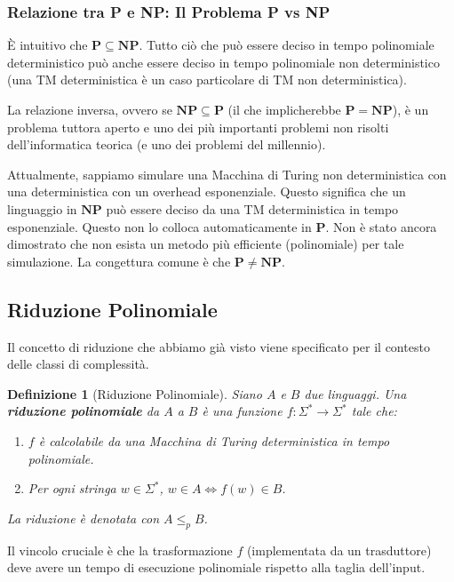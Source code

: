 \documentclass[a4paper]{article}
\newtheorem{definition}{Definizione}
\begin{document}
\subsubsection{Relazione tra P e NP: Il Problema P vs NP}

È intuitivo che $\mathbf{P} \subseteq \mathbf{NP}$. Tutto ciò che può essere deciso in tempo polinomiale deterministico può anche essere deciso in tempo polinomiale non deterministico (una TM deterministica è un caso particolare di TM non deterministica).

La relazione inversa, ovvero se $\mathbf{NP} \subseteq \mathbf{P}$ (il che implicherebbe $\mathbf{P} = \mathbf{NP}$), è un problema tuttora aperto e uno dei più importanti problemi non risolti dell'informatica teorica (e uno dei problemi del millennio).

Attualmente, sappiamo simulare una Macchina di Turing non deterministica con una deterministica con un overhead esponenziale. Questo significa che un linguaggio in $\mathbf{NP}$ può essere deciso da una TM deterministica in tempo esponenziale. Questo non lo colloca automaticamente in $\mathbf{P}$. Non è stato ancora dimostrato che non esista un metodo più efficiente (polinomiale) per tale simulazione. La congettura comune è che $\mathbf{P} \ne \mathbf{NP}$.

\subsection{Riduzione Polinomiale}

Il concetto di riduzione che abbiamo già visto viene specificato per il contesto delle classi di complessità.

\begin{definition}[Riduzione Polinomiale]
Siano $A$ e $B$ due linguaggi. Una \textbf{riduzione polinomiale} da $A$ a $B$ è una funzione $f: \Sigma^* \to \Sigma^*$ tale che:
\begin{enumerate}
    \item $f$ è calcolabile da una Macchina di Turing deterministica in tempo polinomiale.
    \item Per ogni stringa $w \in \Sigma^*$, $w \in A \iff f(w) \in B$.
\end{enumerate}
La riduzione è denotata con $A \le_p B$.
\end{definition}
Il vincolo cruciale è che la trasformazione $f$ (implementata da un trasduttore) deve avere un tempo di esecuzione polinomiale rispetto alla taglia dell'input.
\end{document}
